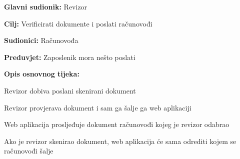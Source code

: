 					\noindent {}
				\begin{packed_item}
					
					\item \textbf{Glavni sudionik:} Revizor
					\item  \textbf{Cilj:} Verificirati dokumente i poslati računovođi
					\item  \textbf{Sudionici:} Računovođa
					\item  \textbf{Preduvjet:} Zaposlenik mora nešto poslati
					\item  \textbf{Opis osnovnog tijeka:}
					
					\item[] \begin{packed_enum}
						
						\item Revizor dobiva poslani skenirani dokument
						\item Revizor provjerava dokument i sam ga šalje ga web aplikaciji
						\item Web aplikacija prosljeđuje dokument računovođi kojeg je revizor odabrao
						\item Ako je revizor skenirao dokument, web aplikacija će sama odrediti kojem se računovođi šalje
						
					\end{packed_enum}
					
				\end{packed_item}
			

